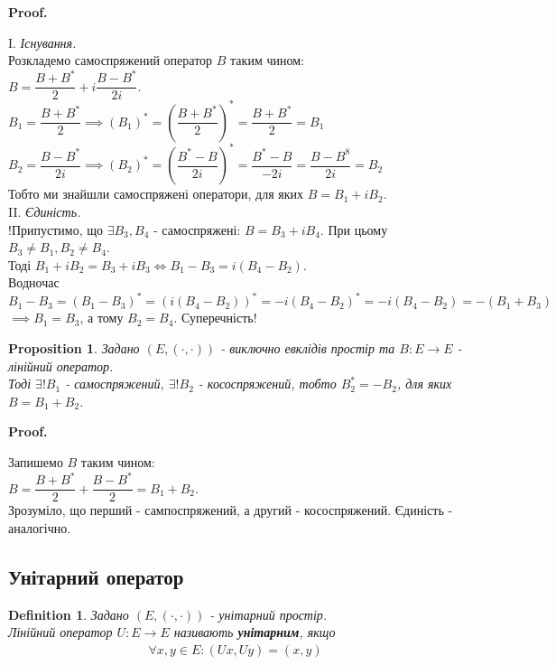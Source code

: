 \documentclass[a4paper, 10pt]{article}
\makeatletter
\theoremstyle{theoremdd}
\newtheorem{definition}[theorem]{Definition}
\newtheorem{proposition}[theorem]{Proposition}
\renewenvironment{proof}[1][Proof.\\]{\par
\pushQED{\hfill \qed}%
\normalfont \topsep6\p@\@plus6\p@\relax
\trivlist
\item\relax
{\bfseries
#1\@addpunct{.}}\hspace\labelsep\ignorespaces
}{%
\popQED\endtrivlist\@endpefalse
}
\makeatother
\begin{document}
\begin{proof}
I. \textit{Існування.}\\
Розкладемо самоспряжений оператор $B$ таким чином:\\
$B = \dfrac{B+B^*}{2}+ i \dfrac{B-B^*}{2i}$.\\
$B_1 = \dfrac{B+B^*}{2} \implies (B_1)^* = \left( \dfrac{B+B^*}{2} \right)^* = \dfrac{B+B^*}{2} = B_1$\\
$B_2 = \dfrac{B-B^*}{2i} \implies (B_2)^* = \left( \dfrac{B^*-B}{2i} \right)^* = \dfrac{B^*-B}{-2i} = \dfrac{B-B^8}{2i} = B_2$\\
Тобто ми знайшли самоспряжені оператори, для яких $B = B_1 + iB_2$.
\bigskip \\
II. \textit{Єдиність.}\\
!Припустимо, що $\exists B_3, B_4$ - самоспряжені: $B = B_3 + i B_4$. При цьому $B_3 \neq B_1, B_2 \neq B_4$.\\
Тоді $B_1 + iB_2 = B_3 + iB_3 \iff B_1-B_3 = i(B_4-B_2)$.\\
Водночас $B_1-B_3=(B_1-B_3)^* = (i(B_4-B_2))^* = -i(B_4-B_2)^* = -i(B_4-B_2) = -(B_1+B_3)$\\
$\implies B_1 = B_3$, а тому $B_2 = B_4$. Суперечність!
\end{proof}

\begin{proposition}
Задано $(E,(\cdot,\cdot))$ - виключно евклідів простір та $B \colon E \to E$ - лінійний оператор.\\
Тоді $\exists! B_1$ - самоспряжений, $\exists! B_2$ - кососпряжений, тобто $B_2^* = -B_2$, для яких $B = B_1 + B_2$.
\end{proposition}

\begin{proof}
Запишемо $B$ таким чином:\\
$B = \dfrac{B+B^*}{2} + \dfrac{B-B^*}{2} = B_1 + B_2$.\\
Зрозуміло, що перший - сампоспряжений, а другий - кососпряжений. Єдиність - аналогічно.
\end{proof}

\subsection{Унітарний оператор}
\begin{definition}
Задано $(E,(\cdot,\cdot))$ - унітарний простір.\\
Лінійний оператор $U \colon E \to E$ називають \textbf{унітарним}, якщо
\begin{align*}
\forall x,y \in E: (Ux,Uy) = (x,y)
\end{align*}
\end{definition}
\end{document}
